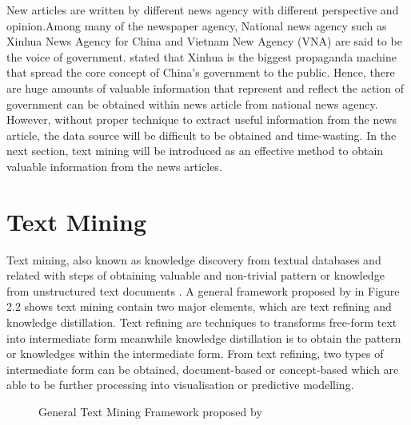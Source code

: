 \documentclass[twoside]{utmthesis}
\begin{document}
New articles are written by different news agency with different perspective and opinion.Among many of the newspaper agency, National news agency such as Xinhua News Agency for China and Vietnam New Agency (VNA) are said to be the voice of government. \cite{gautierbattistellaOctober2005} stated that Xinhua is the biggest propaganda machine that spread the core concept of China's government to the public. Hence, there are huge amounts of valuable information that represent and reflect the action of government can be obtained within  news article from national news agency. However, without proper technique to extract useful information from the news article, the data source will be difficult to be obtained and time-wasting. In the next section, text mining will be introduced as an effective method to obtain valuable information from the news articles.   


\section{Text Mining}
Text mining, also known as knowledge discovery from textual databases and related with steps of obtaining valuable and non-trivial pattern or knowledge from unstructured text documents \citep{tan1999text}. A general framework proposed by \cite{tan1999text} in Figure 2.2 shows text mining contain two major elements, which are text refining and knowledge distillation. Text refining are techniques to transforms free-form text into intermediate form meanwhile knowledge distillation is to obtain the pattern or knowledges within the intermediate form. From text refining, two types of intermediate form can be obtained, document-based or concept-based which are able to be further processing into visualisation or predictive modelling.   

\begin{figure}[h]
\centering
{}
\caption{General Text Mining Framework proposed by \cite{tan1999text}}
\end{figure}
\end{document}
